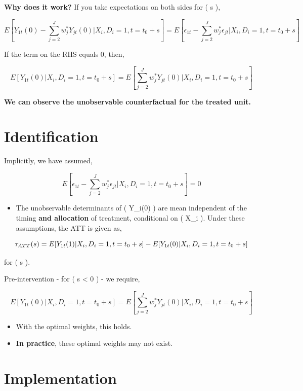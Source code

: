 \documentclass[
  letterpaper,
  DIV=11,
  numbers=noendperiod]{scrreprt}
\providecommand{\tightlist}{%
  \setlength{\itemsep}{0pt}\setlength{\parskip}{0pt}}\usepackage{longtable,booktabs,array}
\theoremstyle{definition}
\theoremstyle{remark}
\begin{document}

\textbf{Why does it work?} If you take expectations on both sides for (
s  ),

\[
E [Y_{1t}(0) - \sum_{j=2}^{J} w_{j}^{*} Y_{jt}(0) | X_i, D_{i} = 1,t=t_0+s] = E [\epsilon_{1t} - \sum_{j=2}^{J} w_{j}^{*} \epsilon_{jt} | X_i, D_{i} = 1,t=t_0+s]
\]

If the term on the RHS equals 0, then,

\[
E [Y_{1t}(0) |X_i,D_{i} = 1,t=t_0+s] = E [\sum_{j=2}^{J} w_{j}^{*} Y_{jt}(0) | X_i, D_{i} = 1,t=t_0+s]
\]

\textbf{We can observe the unobservable counterfactual for the treated
unit.}

\section*{Identification}\label{identification-1}


Implicitly, we have assumed,

\[
E[\epsilon_{1t} - \sum_{j=2}^{J} w_{j}^{*} \epsilon_{jt} | X_i, D_{i} = 1,t=t_0+s] = 0
\]

\begin{itemize}
\tightlist
\item
  The unobservable determinants of ( Y\_i(0) ) are mean independent of
  the timing \textbf{and allocation} of treatment, conditional on ( X\_i
  ). Under these assumptions, the ATT is given as,
\end{itemize}

\[
\tau_{\scriptsize{ATT}}(s) = E[ Y_{1t}(1) | X_i, D_{i} = 1,t=t_0+s] - E [Y_{1t}(0) | X_i, D_{i} = 1,t=t_0+s]
\]

for ( s  ).

Pre-intervention - for ( s \textless{} 0 ) - we require,

\[
E[Y_{1t}(0) |X_i,  D_{i}=1,t=t_0+s] = E[\sum_{j=2}^{J} w_{j}^{*} Y_{jt}(0) | X_i,  D_{i}=1,t=t_0+s]
\]

\begin{itemize}
\tightlist
\item
  With the optimal weights, this holds.
\item
  \textbf{In practice}, these optimal weights may not exist.
\end{itemize}

\section*{Implementation}\label{implementation}
\end{document}
